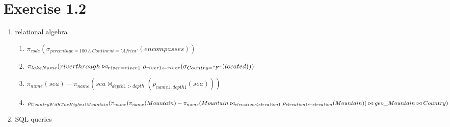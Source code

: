 \documentclass[12pt]{article}
\begin{document}
	\section{Exercise 1.2}
	
	\begin{enumerate}
		\item relational algebra
			\begin{enumerate}[label=(\alph*)]
				\item $\pi_{code}(\sigma_{percentage=100\land Continent='Africa'}(encompasses))$
				\item $\pi_{lakeName}( riverthrough \bowtie_{river=river1} \rho_{river1\leftarrow river}(\sigma_{Country="F"}(located)))$
				\item $\pi_{name}(sea)  - \pi_{name}(sea \bowtie_{depth1 > depth}(\rho_{name1,depth1}(sea)))$
				\item $\rho_{CountryWithTheHighestMountain}(\pi_{name}\\
							(\pi_{name}(Mountain) - \pi_{name}( Mountain \bowtie_{elevation<elevation1} \rho_{elevation1 \leftarrow elevation}(Mountain))\\
							\bowtie geo\_Mountain \bowtie Country
							)$
			\end{enumerate}
		\item SQL queries
			
	\end{enumerate}
\end{document}

